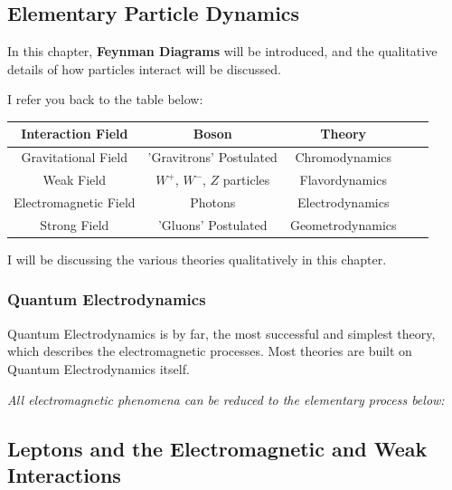 \subsection{Elementary Particle Dynamics}
In this chapter, \textbf{Feynman Diagrams} will be introduced, and the qualitative details of how particles interact will be discussed.

I refer you back to the table below:

\begin{table}[http]
\begin{center}
\begin{tabular}{|c|c|c|c|c|}
\hline Interaction Field & Boson & Theory \\ \hline
Gravitational Field & 'Gravitrons' Postulated & Chromodynamics \\
Weak Field & $W^+$, $W^-$, $Z$ particles & Flavordynamics\\
Electromagnetic Field & Photons & Electrodynamics\\
Strong Field & 'Gluons' Postulated & Geometrodynamics\\
\hline
\end{tabular}
\end{center}
\label{default}
\end{table}

I will be discussing the various theories qualitatively in this chapter.
\subsubsection{Quantum Electrodynamics}
Quantum Electrodynamics is by far, the most successful and simplest theory, which describes the electromagnetic processes. Most theories are built on Quantum Electrodynamics itself.

\emph{All electromagnetic phenomena can be reduced to the elementary process below:}



\subsection{Leptons and the Electromagnetic and Weak Interactions}\label{leptons::sec}

